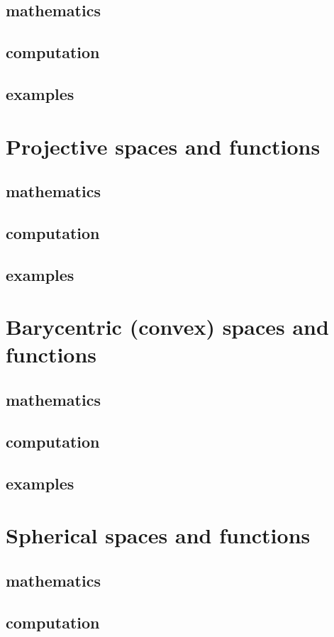 \documentclass[10pt,openany]{book}
\begin{document}
\section{mathematics}
\section{computation}
\section{examples}

\chapter{Projective spaces and functions}
\section{mathematics}
\section{computation}
\section{examples}

\chapter{Barycentric (convex) spaces and functions}
\section{mathematics}
\section{computation}
\section{examples}

\chapter{Spherical spaces and functions}
\section{mathematics}
\section{computation}
\end{document}
